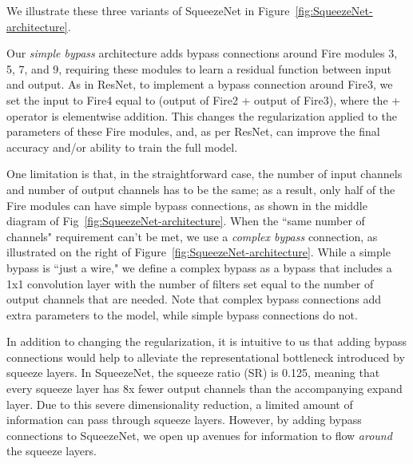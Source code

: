 \documentclass{article} %
\begin{document}
We illustrate these three variants of SqueezeNet in Figure~\ref{fig:SqueezeNet-architecture}.

Our {\em simple bypass} architecture adds bypass connections around Fire modules 3, 5, 7, and 9, requiring these modules to learn a residual function between input and output.
As in ResNet, to implement a bypass connection around Fire3, we set the input to Fire4 equal to (output of Fire2 + output of Fire3), where the + operator is elementwise addition.
This changes the regularization applied to the parameters of these Fire modules, and, as per ResNet, can improve the final accuracy and/or ability to train the full model.

One limitation is that, in the straightforward case, the number of input channels and number of output channels has to be the same; as a result, only half of the Fire modules can have simple bypass connections, as shown in the middle diagram of Fig~\ref{fig:SqueezeNet-architecture}.
When the ``same number of channels" requirement can't be met, we use a {\em complex bypass} connection, as illustrated on the right of Figure~\ref{fig:SqueezeNet-architecture}. 
While a simple bypass is ``just a wire," we define a complex bypass as a bypass that includes a 1x1 convolution layer with the number of filters set equal to the number of output channels that are needed.
Note that complex bypass connections add extra parameters to the model, while simple bypass connections do not.

In addition to changing the regularization, it is intuitive to us that adding bypass connections would help to alleviate the representational bottleneck introduced by squeeze layers.
In SqueezeNet, the squeeze ratio (SR) is 0.125, meaning that every squeeze layer has 8x fewer output channels than the accompanying expand layer.
Due to this severe dimensionality reduction, a limited amount of information can pass through squeeze layers.
However, by adding bypass connections to SqueezeNet, we open up avenues for information to flow {\em around} the squeeze layers.
\end{document}
